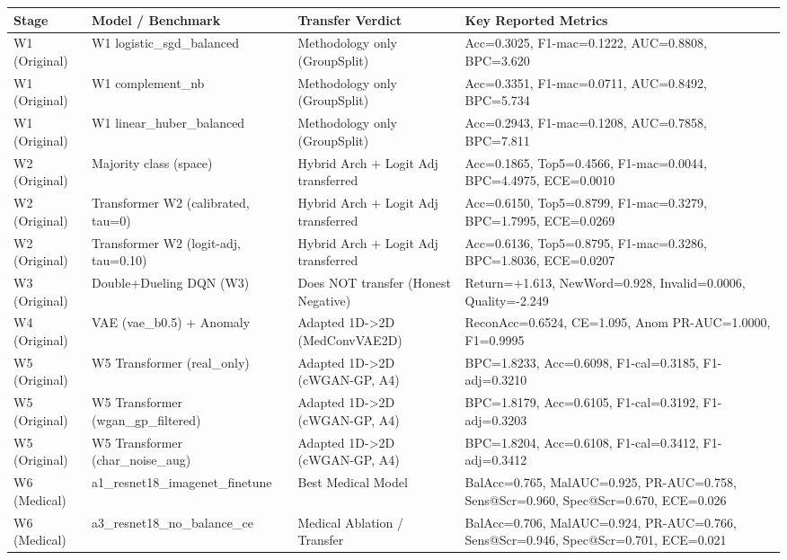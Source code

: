 \begin{tabular}{p{2.2cm}p{4.1cm}p{3.0cm}p{5.5cm}}
\toprule
\textbf{Stage} & \textbf{Model / Benchmark} & \textbf{Transfer Verdict} & \textbf{Key Reported Metrics} \\
\midrule
W1 (Original) & W1 logistic\_sgd\_balanced & Methodology only (GroupSplit) & Acc=0.3025, F1-mac=0.1222, AUC=0.8808, BPC=3.620 \\
W1 (Original) & W1 complement\_nb & Methodology only (GroupSplit) & Acc=0.3351, F1-mac=0.0711, AUC=0.8492, BPC=5.734 \\
W1 (Original) & W1 linear\_huber\_balanced & Methodology only (GroupSplit) & Acc=0.2943, F1-mac=0.1208, AUC=0.7858, BPC=7.811 \\
W2 (Original) & Majority class (space) & Hybrid Arch + Logit Adj transferred & Acc=0.1865, Top5=0.4566, F1-mac=0.0044, BPC=4.4975, ECE=0.0010 \\
W2 (Original) & Transformer W2 (calibrated, tau=0) & Hybrid Arch + Logit Adj transferred & Acc=0.6150, Top5=0.8799, F1-mac=0.3279, BPC=1.7995, ECE=0.0269 \\
W2 (Original) & Transformer W2 (logit-adj, tau=0.10) & Hybrid Arch + Logit Adj transferred & Acc=0.6136, Top5=0.8795, F1-mac=0.3286, BPC=1.8036, ECE=0.0207 \\
W3 (Original) & Double+Dueling DQN (W3) & Does NOT transfer (Honest Negative) & Return=+1.613, NewWord=0.928, Invalid=0.0006, Quality=-2.249 \\
W4 (Original) & VAE (vae\_b0.5) + Anomaly & Adapted 1D->2D (MedConvVAE2D) & ReconAcc=0.6524, CE=1.095, Anom PR-AUC=1.0000, F1=0.9995 \\
W5 (Original) & W5 Transformer (real\_only) & Adapted 1D->2D (cWGAN-GP, A4) & BPC=1.8233, Acc=0.6098, F1-cal=0.3185, F1-adj=0.3210 \\
W5 (Original) & W5 Transformer (wgan\_gp\_filtered) & Adapted 1D->2D (cWGAN-GP, A4) & BPC=1.8179, Acc=0.6105, F1-cal=0.3192, F1-adj=0.3203 \\
W5 (Original) & W5 Transformer (char\_noise\_aug) & Adapted 1D->2D (cWGAN-GP, A4) & BPC=1.8204, Acc=0.6108, F1-cal=0.3412, F1-adj=0.3412 \\
W6 (Medical) & a1\_resnet18\_imagenet\_finetune & Best Medical Model & BalAcc=0.765, MalAUC=0.925, PR-AUC=0.758, Sens@Scr=0.960, Spec@Scr=0.670, ECE=0.026 \\
W6 (Medical) & a3\_resnet18\_no\_balance\_ce & Medical Ablation / Transfer & BalAcc=0.706, MalAUC=0.924, PR-AUC=0.766, Sens@Scr=0.946, Spec@Scr=0.701, ECE=0.021 \\

\end{tabular}
